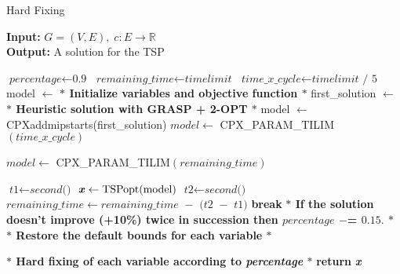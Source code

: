 \begin{algorithm}
    \caption{Hard Fixing}\label{Hard Fixing}
    
    \hspace*{\algorithmicindent} \textbf{Input:} $G = (V,E) , \; c : E \rightarrow \mathbb{R}$\\
    \hspace*{\algorithmicindent} \textbf{Output:} A solution for the TSP
    \begin{algorithmic}[1]
    \State $\textit{percentage} \gets \textit{0.9}$
    \State $\textit{remaining\_time} \gets \textit{timelimit}$
    \State $\textit{time\_x\_cycle} \gets \textit{timelimit / 5}$
    \State model $ \leftarrow $ \textbf{$\ast$ Initialize variables and objective function $\ast$ }
    \State first\_solution $ \leftarrow $ \textbf{$\ast$ Heuristic solution with GRASP + 2-OPT $\ast$ }
    \State model $ \leftarrow $  CPXaddmipstarts(first\_solution)
	\State $ model \gets $ CPX\_PARAM\_TILIM$(\textit{time\_x\_cycle}) $
	
	\Else \State $ model \gets $ CPX\_PARAM\_TILIM$(\textit{remaining\_time}) $
	\EndIf
	
	\State $\textit{t1} \gets \textit{second()}$
    	\State $\textbf{\textit{x}} \gets \text{TSPopt}(\text{model}) $\;
	\State $\textit{t2} \gets \textit{second()}$
	\State $\textit{remaining\_time} \gets \textit{remaining\_time $-$ (t2 $-$ t1)}$
	\State \textbf{break}
	\EndIf
	\State \textbf{$\ast$ If the solution doesn't improve (+10\%) twice in succession then $ percentage $ $ -$= $ 0.15. $ $\ast$}
	\State \textbf{$\ast$ Restore the default bounds for each variable $\ast$}
    	\end{algorithmic}
	\label{alg:hf}
   	\end{algorithm}
	
	\begin{algorithm}                     
   	 \begin{algorithmic} [1]              
	\State \textbf{$\ast$ Hard fixing of each variable according to \textit{percentage} $\ast$}
    \EndWhile
    \State \textbf{return} \textbf{\textit{x}} 
    \end{algorithmic}
    \end{algorithm}

